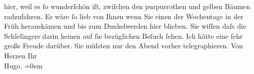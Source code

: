 \begin{ledgroupsized}[t]{13cm}
               hier, weil es ſo wunderſchön iſt, zwiſchen {\pb}den purpurrothen und gelben Bäumen
               radzufahren. Es wäre ſo lieb von Ihnen wenn Sie einen der Wochentage in der Früh
               herauskämen und bis zum Dunkelwerden hier blieben. Sie wiſſen daſs die Schleſingers darin keinen auf ſie
               bezüglichen Beſuch {\pb}ſehen. Ich
               hätte eine ſehr große Freude darüber. Sie müſsten nur den Abend vorher
               telegraphieren.\pend
           \pstart
           Von Herzen Ihr{\\[\baselineskip]}\spacefill\mbox{Hugo.}\pend
           \leftskip=0em{}
         
         \endnumbering{}\end{ledgroupsized}  \newcommand{\dateiname}{L00851}\newcommand{\titel}{Hugo von Hofmannsthal an Arthur Schnitzler, 12. 10. [1898]}\newcommand{\editorInnen}{Martin Anton Müller und Gerd-Hermann Susen}
      